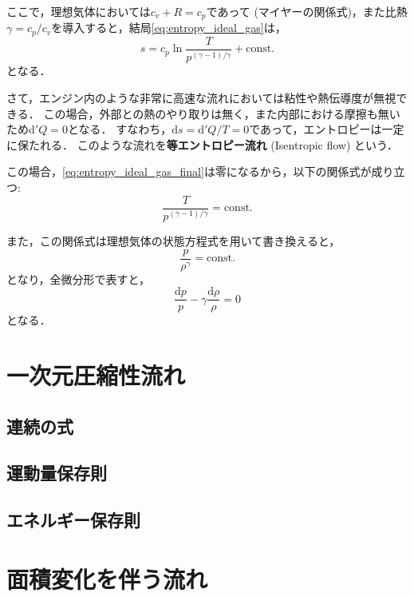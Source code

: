 \documentclass[uplatex,dvipdfmx,a4j,11pt]{jsreport}
\newcommand{\keyword}[1]{\textcolor{mainblue}{\textbf{#1}}}
\newcommand{\diff}{\mathrm{d}} %
\numberwithin{equation}{chapter}
\begin{document}
ここで，理想気体においては$c_v + R = c_p$であって (マイヤーの関係式)，また比熱$\gamma = c_p/c_v$を導入すると，結局\cref{eq:entropy_ideal_gas}は，
\begin{equation}
  s = c_p \ln \frac{T}{p^{(\gamma-1) / \gamma}} + \text{const.}  
  \label{eq:entropy_ideal_gas_final}
\end{equation}
となる．

さて，エンジン内のような非常に高速な流れにおいては粘性や熱伝導度が無視できる．
この場合，外部との熱のやり取りは無く，また内部における摩擦も無いため$\diff'Q = 0$となる．
すなわち，$\diff s = \diff'Q/T = 0$であって，エントロピーは一定に保たれる．
このような流れを\keyword{等エントロピー流れ} (Isentropic flow) という．

この場合，\cref{eq:entropy_ideal_gas_final}は零になるから，以下の関係式が成り立つ:
\begin{equation}
  \frac{T}{p^{(\gamma-1)/\gamma}} = \text{const.}
  \label{eq:isentropic_relations}
\end{equation}

また，この関係式は理想気体の状態方程式を用いて書き換えると，
\begin{equation}
  \frac{p}{\rho^{\gamma}} = \text{const.}
\end{equation}
となり，全微分形で表すと，
\begin{equation}
  \frac{\diff p}{p} - \gamma \frac{\diff \rho}{\rho} = 0
  \label{eq:dp_drho}
\end{equation}
となる．

\section{一次元圧縮性流れ}

\subsection{連続の式}

\subsection{運動量保存則}

\subsection{エネルギー保存則}

\section{面積変化を伴う流れ}
\end{document}
